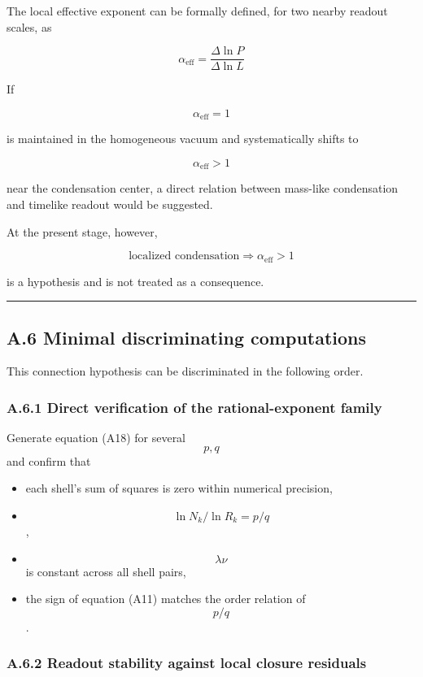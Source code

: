 \documentclass[
  a4paper,
]{article}
\providecommand{\tightlist}{%
  \setlength{\itemsep}{0pt}\setlength{\parskip}{0pt}}
\begin{document}
The local effective exponent can be formally defined, for two nearby
readout scales, as

\[
\boxed{
\alpha_{\mathrm{eff}}
=
\frac{\Delta\ln P}{\Delta\ln L}
}
\tag{A25}
\]

If

\[
\alpha_{\mathrm{eff}}=1
\]

is maintained in the homogeneous vacuum and systematically shifts to

\[
\alpha_{\mathrm{eff}}>1
\]

near the condensation center, a direct relation between mass-like
condensation and timelike readout would be suggested.

At the present stage, however,

\[
\boxed{
\text{localized condensation}
\Longrightarrow
\alpha_{\mathrm{eff}}>1
}
\]

is a hypothesis and is not treated as a consequence.

\begin{center}\rule{0.5\linewidth}{0.5pt}\end{center}

\subsection{A.6 Minimal discriminating
computations}\label{a.6-minimal-discriminating-computations}

This connection hypothesis can be discriminated in the following order.

\subsubsection{A.6.1 Direct verification of the rational-exponent
family}\label{a.6.1-direct-verification-of-the-rational-exponent-family}

Generate equation (A18) for several \[p,q\] and confirm that

\begin{itemize}
\tightlist
\item
  each shell's sum of squares is zero within numerical precision,
\item
  \[\ln N_k/\ln R_k=p/q\],
\item
  \[\lambda\nu\] is constant across all shell pairs,
\item
  the sign of equation (A11) matches the order relation of \[p/q\].
\end{itemize}

\subsubsection{A.6.2 Readout stability against local closure
residuals}\label{a.6.2-readout-stability-against-local-closure-residuals}
\end{document}
